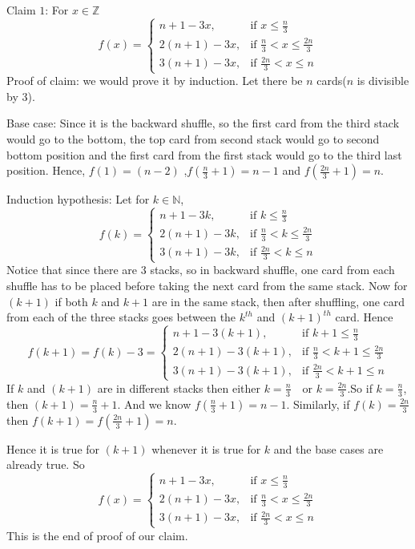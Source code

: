 \documentclass[10pt]{article}
\begin{document}
\vspace{4mm}
Claim $1$: For $x\in\mathbb{Z}$ 
$$f(x)= 
\begin{cases}
    n+1-3x ,& \text{if } x\leq \frac{n}{3}\\
    2(n+1)-3x ,& \text{if } \frac{n}{3}<x\leq \frac{2n}{3}\\
    3(n+1)-3x ,&\text{if }\frac{2n}{3}<x\leq n
\end{cases}$$
\quad Proof of claim: we would prove it by induction. Let there be $n$ cards($n$ is divisible by 3).

Base case: Since it is the backward shuffle, so the first card from the third stack would go to the bottom, the top card from second stack would go to second bottom position and the first card from the first stack would go to the third last position. Hence, $f(1)=(n-2)$ ,$f(\frac{n}{3}+1)=n-1$ and $f(\frac{2n}{3}+1)=n$.

Induction hypothesis: Let for $k\in \mathbb{N}$, $$f(k)=\begin{cases}
    n+1-3k ,& \text{if } k\leq \frac{n}{3}\\
    2(n+1)-3k ,& \text{if } \frac{n}{3}<k\leq \frac{2n}{3}\\
    3(n+1)-3k ,&\text{if }\frac{2n}{3}<k\leq n
\end{cases}$$
Notice that since there are $3$ stacks, so in backward shuffle, one card from each shuffle has to be placed before taking the next card from the same stack.
Now for $(k+1)$ if both $k$ and $k+1$ are in the same stack, then after shuffling, one card from each of the three stacks goes between the $k^{th}$ and $(k+1)^{th}$ card. Hence $$f(k+1)=f(k)-3=\begin{cases}
    n+1-3(k+1) ,& \text{if } k+1\leq \frac{n}{3}\\
    2(n+1)-3(k+1) ,& \text{if } \frac{n}{3}<k+1\leq \frac{2n}{3}\\
    3(n+1)-3(k+1) ,&\text{if }\frac{2n}{3}<k+1\leq n
\end{cases}$$
If $k$ and $(k+1)$ are in different stacks then either $k=\frac{n}{3}\quad\text{or }k=\frac{2n}{3}$.So if $k=\frac{n}{3}$, then $(k+1)=\frac{n}{3}+1$. And we know $f(\frac{n}{3}+1)= n-1$. Similarly, if $f(k)=\frac{2n}{3}$ then $f(k+1)=f(\frac{2n}{3}+1)=n$.

Hence it is true for $(k+1)$ whenever it is true for $k$ and the base cases are already true. So $$f(x)= 
\begin{cases}
    n+1-3x ,& \text{if } x\leq \frac{n}{3}\\
    2(n+1)-3x ,& \text{if } \frac{n}{3}<x\leq \frac{2n}{3}\\
    3(n+1)-3x ,&\text{if }\frac{2n}{3}<x\leq n
\end{cases}$$
This is the end of proof of our claim.
\end{document}
